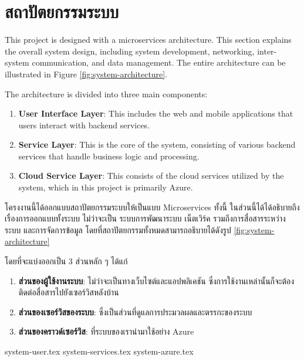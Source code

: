 \section{สถาปัตยกรรมระบบ}
\ifenglish
This project is designed with a microservices architecture. This section explains the overall system design, including system development, networking, inter-system communication, and data management. The entire architecture can be illustrated in Figure \ref{fig:system-architecture}. 

The architecture is divided into three main components: 
\begin{enumerate}
    \item \textbf{User Interface Layer}: This includes the web and mobile applications that users interact with backend services.
    \item \textbf{Service Layer}: This is the core of the system, consisting of various backend services that handle business logic and processing.
    \item \textbf{Cloud Service Layer}: This consists of the cloud services utilized by the system, which in this project is primarily Azure.
\end{enumerate}
\else
โครงงานนี้ได้ออกแบบสถาปัตยกรรมระบบให้เป็นแบบ Microservices ทั้งนี้ ในส่วนนี้ได้ได้อธิบายถึงเรื่องการออกแบบทั้งระบบ ไม่ว่าจะเป็น ระบบการพัฒนาระบบ เน็ตเวิร์ค รวมถึงการสื่อสารระหว่างระบบ และการจัดการข้อมูล โดยที่สถาปัตยกรรมทั้งหมดสามารถอธิบายได้ดังรูป \ref{fig:system-architecture} 

โดยที่จะแบ่งออกเป็น 3 ส่วนหลัก ๆ ได้แก่
\begin{enumerate}
    \item \textbf{ส่วนของผู้ใช้งานระบบ}: ไม่ว่าจะเป็นทางเว็บไซต์และแอปพลิเคชัน ซึ่งการใช้งานเหล่านั้นก็จะต้องติดต่อสื่อสารไปยังเซอร์วิสหลังบ้าน
    \item \textbf{ส่วนของเซอร์วิสของระบบ}: ซึ่งเป็นส่วนที่ดูแลการประมวลผลและตรรกะของระบบ
    \item \textbf{ส่วนของคราวด์เซอร์วิส}: ที่ระบบของเรานำมาใช้อย่าง Azure
\end{enumerate}
\fi


{system-user.tex}
{system-services.tex}
{system-azure.tex}

\clearpage
\begin{landscape}
\end{landscape}